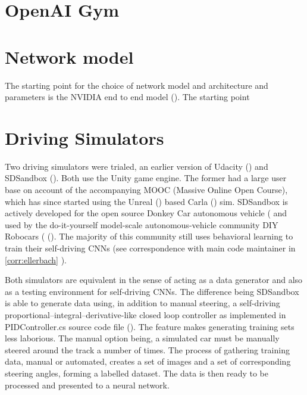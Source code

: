 \section{OpenAI Gym}



\section{Network model}

The starting point for the choice of network model and architecture and parameters is the NVIDIA end to end model (\cite{bojarski2016end}).
The starting point

\section{Driving Simulators}

Two driving simulators were trialed, an earlier version of Udacity (\cite{UdacityCarSim}) and SDSandbox (\cite{SDSandboxSim}). Both use the Unity game engine. The former had a large user base on account of the accompanying MOOC (Massive Online Open Course), which has since started using the Unreal (\cite{unrealengine}) based Carla (\cite{Dosovitskiy17}) sim. SDSandbox is actively developed for the open source Donkey Car autonomous vehicle (\cite{DonkeyCar2020} and used by the do-it-yourself model-scale autonomous-vehicle community DIY Robocars (\cite{DIYRobocars2020} (\cite{DIYRobocars2020}). The majority of this community still uses behavioral learning to train their self-driving CNNs (see correspondence with main code maintainer in \ref{corr:ellerbach}
).  
 
Both simulators are equivalent in the sense of acting as a data generator and also as a testing environment for self-driving CNNs. The difference being SDSandbox is able to generate data using, in addition to manual steering, a self-driving proportional–integral–derivative-like closed loop controller as implemented in PIDController.cs source code file (\cite{SDSandboxSim}). The feature makes generating training sets less laborious. The manual option being, a simulated car must be manually steered around the track a number of times. The process of gathering training data, manual or automated, creates a set of images and a set of corresponding steering angles, forming a labelled dataset.
The data is then ready to be processed and presented to a neural network.

